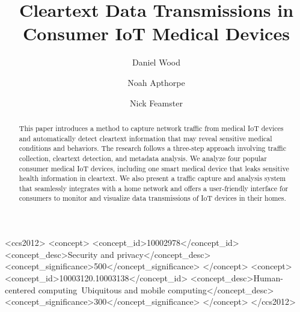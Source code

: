 \documentclass[sigconf]{acmart}
\begin{document}
\title{Cleartext Data Transmissions in Consumer IoT Medical Devices}


\author{Daniel Wood}

\author{Noah Apthorpe}

\author{Nick Feamster}


\renewcommand{\shortauthors}{D. Wood et al.}

\begin{abstract}
This paper introduces a method to
capture network traffic from medical IoT devices and automatically detect cleartext
information that may reveal sensitive medical conditions and behaviors. 
The research follows a three-step approach involving traffic collection, cleartext detection,
and metadata analysis. 
We analyze four popular consumer medical IoT devices, 
including one smart medical device that leaks sensitive
health information in cleartext. 
We also present a traffic capture and analysis system that seamlessly integrates
with a home network and offers
a user-friendly interface for consumers to monitor and visualize data transmissions
of IoT devices in their homes. 

\end{abstract}

%
%
\begin{CCSXML}
<ccs2012>
<concept>
<concept_id>10002978</concept_id>
<concept_desc>Security and privacy</concept_desc>
<concept_significance>500</concept_significance>
</concept>
<concept>
<concept_id>10003120.10003138</concept_id>
<concept_desc>Human-centered computing~Ubiquitous and mobile computing</concept_desc>
<concept_significance>300</concept_significance>
</concept>
</ccs2012>
\end{CCSXML}





\maketitle




 
\end{document}
